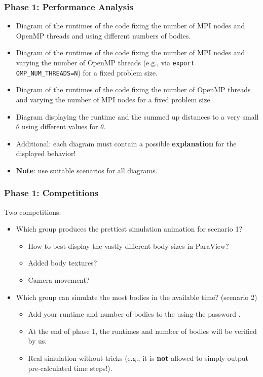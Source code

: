 \begin{frame}[fragile]
  \frametitle{Phase 1: Performance Analysis}
  \begin{itemize}
      \item Diagram of the runtimes of the code fixing the number of MPI nodes and OpenMP threads and using different numbers of bodies.
      \item Diagram of the runtimes of the code fixing the number of MPI nodes and varying the number of OpenMP threads (e.g., via \texttt{export OMP_NUM_THREADS=N}) for a fixed problem size.
      \item Diagram of the runtimes of the code fixing the number of OpenMP threads and varying the number of MPI nodes for a fixed problem size.
      \item Diagram displaying the runtime and the summed up distances to a very small $\theta$ using different values for $\theta$.
      \item Additional: each diagram must contain a possible \textbf{explanation} for the displayed behavior!
      \item \textbf{Note}: use suitable scenarios for all diagrams.
  \end{itemize}
\end{frame}

\begin{frame}[fragile]
  \frametitle{Phase 1: Competitions}
  Two competitions:
  \begin{itemize}
      \item Which group produces the prettiest simulation animation for scenario 1?
      \begin{itemize}
          \item How to best display the vastly different body sizes in ParaView?
          \item Added body textures?
          \item Camera movement?
      \end{itemize}
      \item Which group can simulate the most bodies in the available time? (scenario 2)
      \begin{itemize}
          \item Add your runtime and number of bodies to the  using the password \texttt{\passwordNextcloud}.
          \item At the end of phase 1, the runtimes and number of bodies will be verified by us.
          \item Real simulation without tricks (e.g., it is \textbf{not} allowed to simply output pre-calculated time steps!).
      \end{itemize}
  \end{itemize}
    \vfill
\end{frame}

